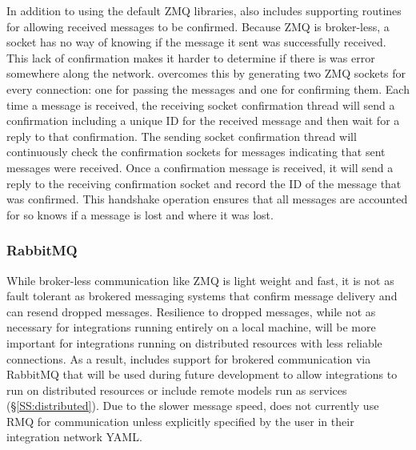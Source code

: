 \documentclass[journal]{IEEEtran}
\newcommand{\todo}[1]{{\color{red}{#1}}}
\newcommand{\pkg}{{\tt \todo{cis\_interface}}{}}
\begin{document}
In addition to using the default ZMQ libraries, {\pkg} also includes supporting routines for allowing received messages to be confirmed. Because ZMQ is broker-less, a socket has no way of knowing if the message it sent was successfully received. This lack of confirmation makes it harder to determine if there is was error somewhere along the network. {\pkg} overcomes this by generating two ZMQ sockets for every connection: one for passing the messages and one for confirming them. Each time a message is received, the receiving socket confirmation thread will send a confirmation including a unique ID for the received message and then wait for a reply to that confirmation. The sending socket confirmation thread will continuously check the confirmation sockets for messages indicating that sent messages were received. Once a confirmation message is received, it will send a reply to the receiving confirmation socket and record the ID of the message that was confirmed. This handshake operation ensures that all messages are accounted for so {\pkg} knows if a message is lost and where it was lost.


\subsubsection{RabbitMQ}\label{SSS:rmq}
%
While broker-less communication like ZMQ is light weight and fast, it is not as fault tolerant as brokered messaging systems that confirm message delivery and can resend dropped messages. Resilience to dropped messages, while not as necessary for integrations running entirely on a local machine, will be more important for integrations running on distributed resources with less reliable connections. As a result, {\pkg} includes support for brokered communication via RabbitMQ \citep[RMQ][]{RMQ} that will be used during future development to allow integrations to run on distributed resources or include remote models run as services (\S\ref{SS:distributed}). Due to the slower message speed, {\pkg} does not currently use RMQ for communication unless explicitly specified by the user in their integration network YAML. 

\end{document}
